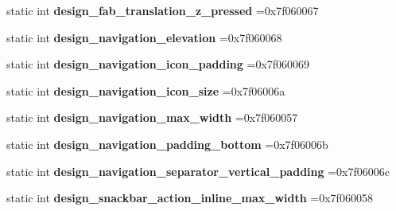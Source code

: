 \begin{DoxyCompactItemize}
static int {\bfseries design\+\_\+fab\+\_\+translation\+\_\+z\+\_\+pressed} =0x7f060067
\item 
\mbox{\label{classandroid_1_1support_1_1design_1_1R_1_1dimen_a34522222aeddb777b3882f39be4db766}} 
static int {\bfseries design\+\_\+navigation\+\_\+elevation} =0x7f060068
\item 
\mbox{\label{classandroid_1_1support_1_1design_1_1R_1_1dimen_ae586889cbd0fcdb04dcd488035a319fe}} 
static int {\bfseries design\+\_\+navigation\+\_\+icon\+\_\+padding} =0x7f060069
\item 
\mbox{\label{classandroid_1_1support_1_1design_1_1R_1_1dimen_a749224c8941f253fd9985d435403b048}} 
static int {\bfseries design\+\_\+navigation\+\_\+icon\+\_\+size} =0x7f06006a
\item 
\mbox{\label{classandroid_1_1support_1_1design_1_1R_1_1dimen_a70acfe960d957939484957161d008a9d}} 
static int {\bfseries design\+\_\+navigation\+\_\+max\+\_\+width} =0x7f060057
\item 
\mbox{\label{classandroid_1_1support_1_1design_1_1R_1_1dimen_af7846431097a351a5e9e4a19fc523627}} 
static int {\bfseries design\+\_\+navigation\+\_\+padding\+\_\+bottom} =0x7f06006b
\item 
\mbox{\label{classandroid_1_1support_1_1design_1_1R_1_1dimen_ab9dc26977fc6688e0ca0ee25bed117fe}} 
static int {\bfseries design\+\_\+navigation\+\_\+separator\+\_\+vertical\+\_\+padding} =0x7f06006c
\item 
\mbox{\label{classandroid_1_1support_1_1design_1_1R_1_1dimen_a0c917b6b1c287c5e5c5ff9f02c3c26a9}} 
static int {\bfseries design\+\_\+snackbar\+\_\+action\+\_\+inline\+\_\+max\+\_\+width} =0x7f060058
\item 
\mbox{\label{classandroid_1_1support_1_1design_1_1R_1_1dimen_a21dc6377f076bda4be99ce308a6e546f}} 

\end{DoxyCompactItemize}
